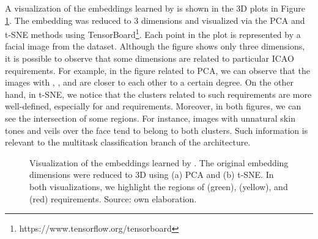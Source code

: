 A visualization of the embeddings learned by \methodname is shown in the 3D plots in Figure \ref{fig:embviz}. The embedding was reduced to 3 dimensions and visualized via the PCA and t-SNE methods using TensorBoard\footnote{https://www.tensorflow.org/tensorboard}. Each point in the plot is represented by a facial image from the dataset. Although the figure shows only three dimensions, it is possible to observe that some dimensions are related to particular ICAO requirements. For example, in the figure related to PCA, we can observe that the images with \variedbackground, \unnaturalskintone, and \veiloverface are closer to each other to a certain degree. On the other hand, in t-SNE, we notice that the clusters related to such requirements are more well-defined, especially for \variedbackground and \veiloverface requirements. Moreover, in both figures, we can see the intersection of some regions. For instance, images with unnatural skin tones and veils over the face tend to belong to both clusters. Such information is relevant to the multitask classification branch of the \methodname architecture. 
 
\begin{figure}[htb]
\centering
{}
\caption{Visualization of the embeddings learned by \methodname. The original embedding dimensions were reduced to 3D using (a) PCA and (b) t-SNE. In both visualizations, we highlight the regions of \variedbackground (green), \unnaturalskintone (yellow), and \veiloverface (red) requirements. Source: own elaboration.}
\label{fig:embviz}
\end{figure}
 
